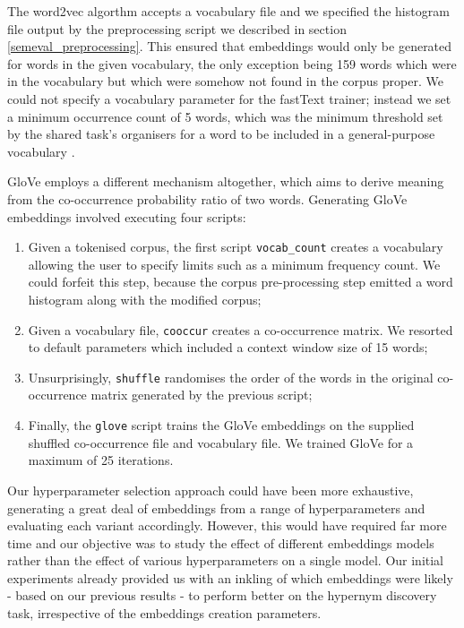 The word2vec algorthm accepts a vocabulary file and we specified the histogram file output by the preprocessing script we described in section \ref{semeval_preprocessing}.  This ensured that embeddings would only be generated for words in the given vocabulary, the only exception being 159 words which were in the vocabulary but which were somehow not found in the corpus proper.  We could not specify a vocabulary parameter for the fastText trainer; instead we set a minimum occurrence count of 5 words, which was the minimum threshold set by the shared task's organisers for a word to be included in a general-purpose vocabulary \citep{camacho2018semeval}.  

GloVe employs a different mechanism altogether, which aims to derive meaning from the co-occurrence probability ratio of two words.  Generating GloVe embeddings involved executing four scripts:
\begin{enumerate}
    \item Given a tokenised corpus, the first script \texttt{vocab\_count} creates a vocabulary allowing the user to specify limits such as a minimum frequency count.  We could forfeit this step, because the corpus pre-processing step emitted a word histogram along with the modified corpus;
    \item Given a vocabulary file, \texttt{cooccur} creates a co-occurrence matrix.  We resorted to default parameters which included a context window size of 15 words;
    \item Unsurprisingly, \texttt{shuffle} randomises the order of the words in the original co-occurrence matrix generated by the previous script;
    \item Finally, the \texttt{glove} script trains the GloVe embeddings on the supplied shuffled co-occurrence file and vocabulary file.  We trained GloVe for a maximum of 25 iterations.  
\end{enumerate}

Our hyperparameter selection approach could have been more exhaustive, generating a great deal of embeddings from a range of hyperparameters and evaluating each variant accordingly.  However, this would have required far more time and our objective was to study the effect of different embeddings models rather than the effect of various hyperparameters on a single model.  Our initial experiments already provided us with an inkling of which embeddings were likely - based on our previous results - to perform better on the hypernym discovery task, irrespective of the embeddings creation parameters.

